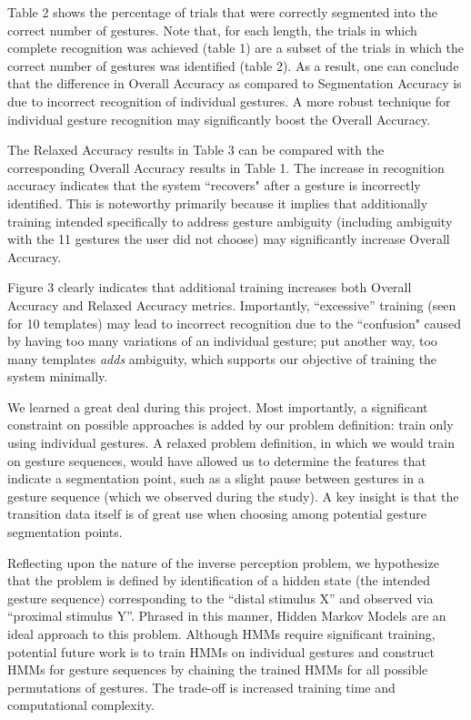 \documentclass[twoside]{article}
\begin{document}
\begin{multicols}{2}
Table 2 shows the percentage of trials that were correctly segmented into the
correct number of gestures. Note that, for each length, the trials in which
complete recognition was achieved (table 1) are a subset of the trials in which
the correct number of gestures was identified (table 2). As a result, one can
conclude that the difference in Overall Accuracy as compared to Segmentation
Accuracy is due to incorrect recognition of individual gestures. A more robust
technique for individual gesture recognition may significantly boost the
Overall Accuracy.

The Relaxed Accuracy results in Table 3 can be compared with the corresponding
Overall Accuracy results in Table 1. The increase in recognition accuracy
indicates that the system ``recovers" after a gesture is incorrectly identified.
This is noteworthy primarily because it implies that additionally training
intended specifically to address gesture ambiguity (including ambiguity with the
11 gestures the user did not choose) may significantly increase Overall
Accuracy.

Figure 3 clearly indicates that additional training increases both Overall
Accuracy and Relaxed Accuracy metrics. Importantly, ``excessive'' training (seen
for 10 templates) may lead to incorrect recognition due to the ``confusion"
caused by having too many variations of an individual gesture; put another way,
too many templates \emph{adds} ambiguity, which supports our objective of training
the system minimally.

We learned a great deal during this project. Most importantly, a significant
constraint on possible approaches is added by our problem definition: train only
using individual gestures. A relaxed problem definition, in which we would
train on gesture sequences, would have allowed us to determine the features that
indicate a segmentation point, such as a slight pause between gestures in a
gesture sequence (which we observed during the study). A key insight is that the
transition data itself is of great use when choosing among potential gesture
segmentation points.

Reflecting upon the nature of the inverse perception problem, we hypothesize
that the problem is defined by identification of a hidden state (the intended
gesture sequence) corresponding to the ``distal stimulus X'' and observed via
``proximal stimulus Y''. Phrased in this manner, Hidden Markov Models are an
ideal approach to this problem. Although HMMs require significant training,
potential future work is to train HMMs on individual gestures and construct HMMs
for gesture sequences by chaining the trained HMMs for all possible permutations of
gestures. The trade-off is increased training time and computational complexity.

\end{multicols}
\end{document}
